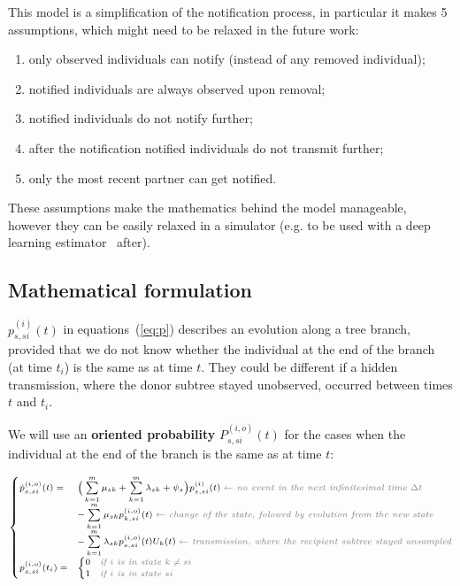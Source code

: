 \documentclass[a4paper,10pt]{article}
\begin{document}
This model is a simplification of the notification process, in particular it makes 5 assumptions, which might need to be relaxed in the future work:
\begin{enumerate}
\item only observed individuals can notify (instead of any removed individual);
\item notified individuals are always observed upon removal;
\item notified individuals do not notify further;
\item after the notification notified individuals do not transmit further;
\item only the most recent partner can get notified.
\end{enumerate}

These assumptions make the mathematics behind the model manageable, however they can be easily relaxed in a simulator (e.g. to be used with a deep learning estimator~\cite{Voznica2021} after).

\subsection{Mathematical formulation}
$p_{s,si}^{(i)}(t)$ in equations~(\ref{eq:p}) describes an evolution along a tree branch, provided that we do not know whether the individual at the end of the branch (at time $t_i$) is the same as at time $t$. They could be different if a hidden transmission, where the donor subtree stayed unobserved, occurred between times $t$ and $t_i$.

We will use an \textbf{oriented probability} $P^{(i,o)}_{s,si}(t)$ for the cases when the individual at the end of the branch is the same as at time $t$:

\begin{equation}
\scriptsize
\begin{cases}
\dot{p}_{s,si}^{(i,o)}(t) = & \Big(\sum\limits_{k=1}^{m} \mu_{sk} + \sum\limits_{k=1}^{m} \lambda_{sk} + \psi_s\Big) p_{s,si}^{(i)}(t)\; \textit{\color{gray} $\leftarrow$ no event in the next infinitesimal time $\Delta t$ }\\
    & - \sum\limits_{k=1}^{m} \mu_{sk} p_{k,si}^{(i,o)}(t)\;  \textit{\color{gray} $\leftarrow$ change of the state, folowed by evolution from the new state }\\
    & - \sum\limits_{k=1}^{m} \lambda_{sk} p_{s,si}^{(i,o)}(t)U_{k}(t)\;  \textit{\color{gray} $\leftarrow$ transmission, where the recipient subtree stayed unsampled}\\
p_{s,si}^{(i,o)}(t_i) = & 
    \begin{cases}
    0 & \textit{\color{gray} if $i$ is in state $k \neq si$}\\
    1 & \textit{\color{gray} if $i$ is in state $si$}
    \end{cases}\label{eq:p-o}
\end{cases}
\end{equation}
\end{document}
